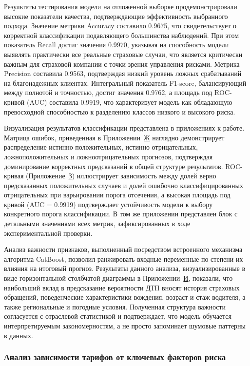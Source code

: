 Результаты тестирования модели на отложенной выборке продемонстрировали высокие показатели качества, подтверждающие эффективность выбранного подхода. Значение метрики Accuracy составило 0.9675, что свидетельствует о корректной классификации подавляющего большинства наблюдений. При этом показатель Recall достиг значения 0.9970, указывая на способность модели выявлять практически все реальные страховые случаи, что является критически важным для страховой компании с точки зрения управления рисками. Метрика Precision составила 0.9563, подтверждая низкий уровень ложных срабатываний на благонадежных клиентах. Интегральный показатель F1-score, балансирующий между полнотой и точностью, достиг значения 0.9762, а площадь под ROC-кривой (AUC) составила 0.9919, что характеризует модель как обладающую превосходной способностью к разделению классов низкого и высокого риска.

Визуализация результатов классификации представлена в приложениях к работе. Матрица ошибок, приведенная в Приложении~\hyperref[app:confusion]{Ж} наглядно демонстрирует распределение истинно положительных, истинно отрицательных, ложноположительных и ложноотрицательных прогнозов, подтверждая доминирование корректных предсказаний в общей структуре результатов. ROC-кривая (Приложение~\hyperref[app:roc]{З}) иллюстрирует зависимость между долей верно предсказанных положительных случаев и долей ошибочно классифицированных отрицательных при варьировании порога отсечения, а высокая площадь под кривой (AUC = 0.9919) подтверждает устойчивость модели к выбору конкретного порога классификации. В том же приложении представлен блок с детальными значениями всех метрик, зафиксированных в ходе экспериментальной проверки.

Анализ важности признаков, выполненный посредством встроенного механизма алгоритма CatBoost, позволил ранжировать входные переменные по степени их влияния на итоговый прогноз. Результаты данного анализа, визуализированные в виде горизонтальной столбчатой диаграммы в Приложении~\hyperref[app:importance_detailed]{И}, показали, что наибольший вклад в предсказание вероятности ДТП вносят история страховых обращений, поведенческие характеристики вождения, возраст и стаж водителя, а также региональные и погодные условия. Полученная структура важности согласуется с отраслевой статистикой и подтверждает, что модель обучается интерпретируемым закономерностям, а не просто запоминает шумовые паттерны в данных.

\subsubsection{Анализ зависимости тарифов от ключевых факторов риска}

